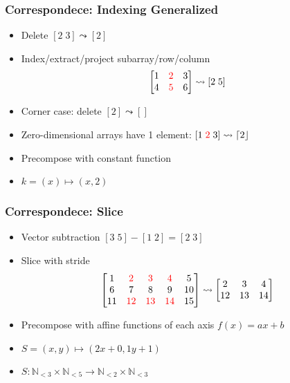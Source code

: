 \documentclass[xetex,mathserif,serif]{beamer}
\newcommand\Nat{\mathbb{N}}
\newcommand\NB[1]{\textcolor{red}{#1}}
\begin{document}
\begin{frame}
  \frametitle{Correspondece: Indexing Generalized}
  \begin{itemize}%
    \item Delete \([2\;3] \leadsto [2]\)
    \item Index/extract/project subarray/row/column
      \[
        \begin{bmatrix}
          1 & \NB 2 & 3 \\ 4 & \NB 5 & 6
        \end{bmatrix} \leadsto
        [2\;5]
      \]
    \item Corner case: delete \([2] \leadsto []\)
    \item Zero-dimensional arrays have 1 element: \([1\;\NB 2\;3] \leadsto \lceil 2\rfloor\)  
    \item Precompose with constant function
    \item \(k = (x)\mapsto (x, 2)\)
  \end{itemize}
\end{frame}

\begin{frame}
  \frametitle{Correspondece: Slice}
  \begin{itemize}%
    \item Vector subtraction \( [3\;5] - [1\;2] = [2\;3] \)
    \item Slice with stride
      \[
        \begin{bmatrix}
          1 & \NB 2 & \NB 3 & \NB 4 & 5 \\
          6 & 7 & 8 &  9 & 10 \\
          11 & \NB{12} & \NB{13} & \NB{14} & 15
        \end{bmatrix} \leadsto \begin{bmatrix}
          2 & 3 & 4 \\
          12 & 13 & 14
        \end{bmatrix}
      \]
    \item Precompose with affine functions of each axis \(f(x) = ax + b\)
    \item \(S = (x, y) \mapsto (2x + 0, 1y + 1)\)
    \item \(S : \Nat_{<3}\times\Nat_{<5} \to \Nat_{<2}\times\Nat_{<3}\)
  \end{itemize}
\end{frame}
\end{document}
